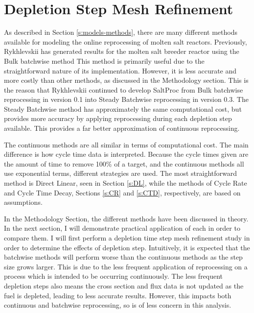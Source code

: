 \renewcommand*\descriptionlabel[1]{\hspace\leftmargin$#1$}
\setcounter{tocdepth}{5}
\setcounter{secnumdepth}{5}


\section{Depletion Step Mesh Refinement}
\label{s:dep-mesh}

As described in Section \ref{s:models-methods}, there are many different methods available for modeling the online reprocessing of molten salt reactors.
Previously, Rykhlevskii has generated results for the molten salt breeder reactor using the Bulk batchwise method \cite{rykhlevskii_advanced_2018}
This method is primarily useful due to the straightforward nature of its implementation.
However, it is less accurate and more costly than other methods, as discussed in the Methodology section.
This is the reason that Rykhlevskii continued to develop SaltProc from Bulk batchwise reprocessing in version 0.1 into Steady Batchwise reprocessing in version 0.3.
The Steady Batchwise method has approximately the same computational cost, but provides more accuracy by applying reprocessing during each depletion step available.
This provides a far better approximation of continuous reprocessing.

The continuous methods are all similar in terms of computational cost.
The main difference is how cycle time data is interpreted.
Because the cycle times given are the amount of time to remove 100\% of a target, and the continuous methods all use exponential terms, different strategies are used.
The most straightforward method is Direct Linear, seen in Section \ref{s:DL}, while the methods of Cycle Rate and Cycle Time Decay, Sections \ref{s:CR} and \ref{s:CTD}, respectively, are based on assumptions.

In the Methodology Section, the different methods have been discussed in theory.
In the next section, I will demonstrate practical application of each in order to compare them.
I will first perform a depletion time step mesh refinement study in order to determine the effects of depletion step.
Intuitively, it is expected that the batchwise methods will perform worse than the continuous methods as the step size grows larger.
This is due to the less frequent application of reprocessing on a process which is intended to be occurring continuously.
The less frequent depletion steps also means the cross section and flux data is not updated as the fuel is depleted, leading to less accurate results.
However, this impacts both continuous and batchwise reprocessing, so is of less concern in this analysis.

